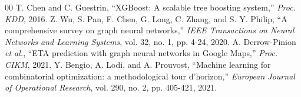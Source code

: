 \documentclass[conference]{IEEEtran}
\begin{document}
\begin{thebibliography}{00}
T. Chen and C. Guestrin, ``XGBoost: A scalable tree boosting system,'' \emph{Proc. KDD}, 2016.
Z. Wu, S. Pan, F. Chen, G. Long, C. Zhang, and S. Y. Philip, ``A comprehensive survey on graph neural networks,'' \emph{IEEE Transactions on Neural Networks and Learning Systems}, vol. 32, no. 1, pp. 4-24, 2020.
A. Derrow-Pinion \textit{et al.}, ``ETA prediction with graph neural networks in Google Maps,'' \emph{Proc. CIKM}, 2021.
Y. Bengio, A. Lodi, and A. Prouvost, ``Machine learning for combinatorial optimization: a methodological tour d'horizon,'' \emph{European Journal of Operational Research}, vol. 290, no. 2, pp. 405-421, 2021.
\end{thebibliography}
\end{document}
